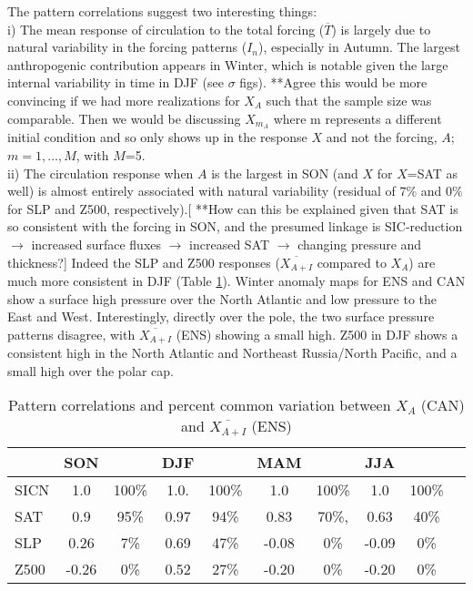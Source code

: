 \documentclass[12pt]{article}
\begin{document}
The pattern correlations suggest two interesting things:\\
i) The mean response of circulation to the total forcing ($\overline{T}$) is largely due to natural variability in the forcing patterns ($I_n$), especially in Autumn. The largest anthropogenic contribution appears in Winter, which is notable given the large internal variability in time in DJF (see $\sigma$ figs). **Agree this would be more convincing if we had more realizations for $X_A$ such that the sample size was comparable. Then we would be discussing $X_{m_A}$ where m represents a different initial condition and so only shows up in the response $X$ and not the forcing, $A$; $m=1,\ldots,M$, with $M$=5.\\
ii) The circulation response when $A$ is the largest in SON (and $X$ for $X$=SAT as well) is almost entirely associated with natural variability (residual of $7\%$ and $0\%$ for SLP and Z500, respectively).[ **How can this be explained given that SAT is so consistent with the forcing in SON, and the presumed linkage is SIC-reduction $\to$ increased surface fluxes $\to$ increased SAT $\to$ changing pressure and thickness?] Indeed the SLP and Z500 responses ($\overline{X_{A+I}}$ compared to $X_A$) are much more consistent in DJF (Table \ref{tbl:corrs}). Winter anomaly maps for ENS and CAN show a surface high pressure over the North Atlantic and low pressure to the East and West. Interestingly, directly over the pole, the two surface pressure patterns disagree, with $\overline{X_{A+I}}$ (ENS) showing a small high. Z500 in DJF shows a consistent high in the North Atlantic and Northeast Russia/North Pacific, and a small high over the polar cap.

\begin{table}[t]
\caption{Pattern correlations and percent common variation between $X_A$ (CAN) and $\overline{X_{A+I}}$ (ENS)}\label{tbl:corrs}
\begin{center}
\begin{tabular}{l|cc|cc|cc|ccc}
\hline\hline
           & SON      &                 & DJF &                & MAM &       & JJA &    \\
\hline
SICN & 1.0       &  100\%    & 1.0.    & 100\% & 1.0       &  100\% & 1.0    &  100\% \\
SAT  & 0.9        &  95\%        & 0.97    & 94\%   & 0.83    & 70\%,   &  0.63   &   40\%  \\
SLP &  0.26      &   7\%       & 0.69  &  47\%      & -0.08    & 0\%      &  -0.09  & 0\%   \\
Z500   & -0.26  & 0\%        & 0.52     & 27\%      &  -0.20  & 0\%      &  -0.20 & 0\% \\
\hline
\end{tabular}
\end{center}
\end{table}


\clearpage


\end{document}

